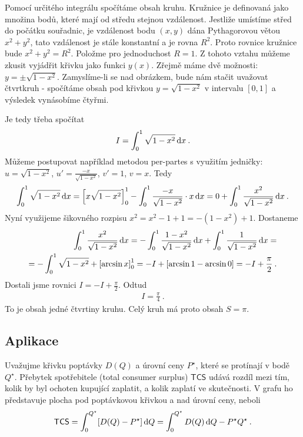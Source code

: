 \begin{example}
    Pomocí určitého integrálu spočítáme obsah kruhu. Kružnice je definovaná jako množina bodů, které mají od středu stejnou vzdálenost. Jestliže umístíme střed do počátku souřadnic, je vzdálenost bodu $(x,y)$ dána Pythagorovou větou $x^2 + y^2$, tato vzdálenost je stále konstantní a je rovna $R^2$. Proto rovnice kružnice bude $x^2 + y^2 = R^2$. Položme pro jednoduchost $R=1$.
    Z tohoto vztahu můžeme zkusit vyjádřit křivku jako funkci $y(x)$. Zřejmě máme dvě možnosti: $y = \pm \sqrt{1-x^2}$. Zamyslíme-li se nad obrázkem, bude nám stačit uvažovat čtvrtkruh - spočítáme obsah pod křivkou $y = \sqrt{1-x^2}$ v intervalu $[0,1]$ a výsledek vynásobíme čtyřmi.

    Je tedy třeba spočítat \begin{align}
        I = \int_0^1 \sqrt{1-x^2} \, \mathrm{d} x \:.
    \end{align}
    Můžeme postupovat například metodou per-partes s využitím jedničky: $u=\sqrt{1-x^2}$, $u'=\frac{-x}{\sqrt{1-x^2}}$, $v'=1$, $v=x$. Tedy \begin{align}
        \int_0^1 \sqrt{1-x^2} \, \mathrm{d} x = \left[ x \sqrt{1-x^2}\right]_0^1 - \int_0^1 \frac{-x}{\sqrt{1-x^2}} \cdot x \, \mathrm{d} x = 0 + \int_0^1 \frac{x^2}{\sqrt{1-x^2}} \, \mathrm{d} x \:.
    \end{align}
    Nyní využijeme šikovného rozpisu $x^2 = x^2-1+1 = -(1-x^2) + 1$. Dostaneme \begin{align}
        \int_0^1 \frac{x^2}{\sqrt{1-x^2}} \, \mathrm{d} x = -\int_0^1 \frac{1-x^2}{\sqrt{1-x^2}} \, \mathrm{d} x + \int_0^1 \frac{1}{\sqrt{1-x^2}} \, \mathrm{d} x 
        = \\ = 
         -\int_0^1 \sqrt{1-x^2} + \left[ \arcsin x \right]_0^1 = - I + \left[ \arcsin 1 - \arcsin 0 \right] = - I + \frac{\pi}{2} \:.
    \end{align}
    Dostali jsme rovnici $I = - I + \frac{\pi}{2}$. Odtud \begin{align}
        I = \frac{\pi}{4} \:.
    \end{align}
    To je obsah jedné čtvrtiny kruhu. Celý kruh má proto obsah $S = \pi$.
\end{example}

\subsection*{Aplikace}

\begin{example}
    Uvažujme křivku poptávky $D(Q)$ a úrovní ceny $P^\star$, které se protínají v bodě $Q^\star$. Přebytek spotřebitele (total consumer surplus) $\mathsf{TCS}$ udává rozdíl mezi tím, kolik by byl ochoten kupující zaplatit, a kolik zaplatí ve skutečnosti. V grafu ho představuje plocha pod poptávkovou křivkou a nad úrovní ceny, neboli \begin{align}
        \mathsf{TCS} = \int_0^{Q^\star} [D(Q) - P^\star] \, \mathrm{d} Q = \int_0^{Q^\star} D(Q) \, \mathrm{d} Q  - P^\star Q^\star \:.
    \end{align}
\end{example}


